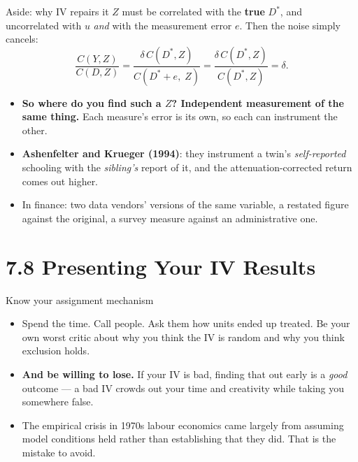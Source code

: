 \documentclass[
  11pt,
  ignorenonframetext,
  aspectratio=169,
]{beamer}
\providecommand{\tightlist}{%
  \setlength{\itemsep}{0pt}\setlength{\parskip}{0pt}}
\begin{document}
\begin{frame}{Aside: why IV repairs it}
\protect{}\label{aside-why-iv-repairs-it}
\(Z\) must be correlated with the \textbf{true} \(D^*\), and
uncorrelated with \(u\) \emph{and} with the measurement error \(e\).
Then the noise simply cancels: \[
\frac{C(Y,Z)}{C(D,Z)}
= \frac{\delta\,C(D^*,Z)}{C(D^* + e,\;Z)}
= \frac{\delta\,C(D^*,Z)}{C(D^*,Z)}
= \delta .
\]

\begin{itemize}
\tightlist
\item
  \textbf{So where do you find such a \(Z\)? Independent measurement of
  the same thing.} Each measure's error is its own, so each can
  instrument the other.
\item
  \textbf{Ashenfelter and Krueger (1994)}: they instrument a twin's
  \emph{self-reported} schooling with the \emph{sibling's} report of it,
  and the attenuation-corrected return comes out higher.
\item
  In finance: two data vendors' versions of the same variable, a
  restated figure against the original, a survey measure against an
  administrative one.
\end{itemize}
\end{frame}

\section{7.8 Presenting Your IV
Results}\label{presenting-your-iv-results}

\begin{frame}{Know your assignment mechanism}
\protect{}\label{know-your-assignment-mechanism}
\begin{itemize}
\tightlist
\item
  Spend the time. Call people. Ask them how units ended up treated. Be
  your own worst critic about why you think the IV is random and why you
  think exclusion holds.
\item
  \textbf{And be willing to lose.} If your IV is bad, finding that out
  early is a \emph{good} outcome --- a bad IV crowds out your time and
  creativity while taking you somewhere false.
\item
  The empirical crisis in 1970s labour economics came largely from
  assuming model conditions held rather than establishing that they did.
  That is the mistake to avoid.
\end{itemize}
\end{frame}
\end{document}
